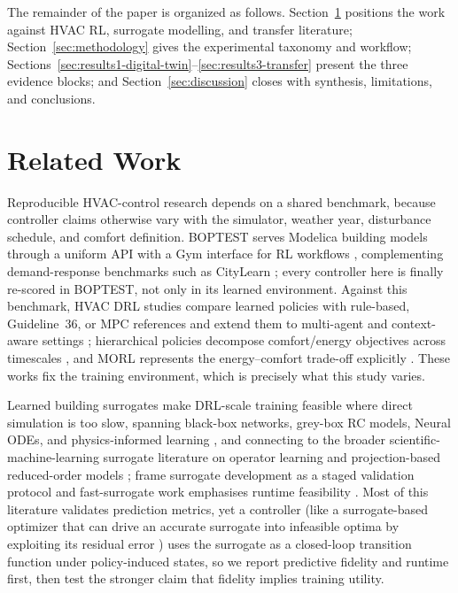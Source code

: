 \documentclass[a4paper,fleqn]{cas-sc}
\begin{document}
The remainder of the paper is organized as follows. Section~\ref{sec:related} positions the work against HVAC RL, surrogate modelling, and transfer literature; Section~\ref{sec:methodology} gives the experimental taxonomy and workflow; Sections~\ref{sec:results1-digital-twin}--\ref{sec:results3-transfer} present the three evidence blocks; and Section~\ref{sec:discussion} closes with synthesis, limitations, and conclusions.

\section{Related Work}\label{sec:related}
Reproducible HVAC-control research depends on a shared benchmark, because controller claims otherwise vary with the simulator, weather year, disturbance schedule, and comfort definition. BOPTEST serves Modelica building models through a uniform API \citep{Blum2021BOPTEST,Wetter2014Modelica} with a Gym interface for RL workflows \citep{Arroyo2021GymBOPTEST}, complementing demand-response benchmarks such as CityLearn \citep{VazquezCanteli2019CityLearn,VazquezCanteli2019Review}; every controller here is finally re-scored in BOPTEST, not only in its learned environment. Against this benchmark, HVAC DRL studies compare learned policies with rule-based, Guideline~36, or MPC references \citep{Savino2025ASHRAE,Wang2025SafeDRL,Nguyen2024Modelling,Sun2024DirectTSup} and extend them to multi-agent and context-aware settings \citep{Deng2025MultiAgent,Alotaibi2025ContextAware}; hierarchical policies decompose comfort/energy objectives across timescales \citep{Liao2025HDRL,Bacon2017Options,Nachum2018HIRO}, and MORL represents the energy--comfort trade-off explicitly \citep{Yang2019MORL,Roijers2013MOSurvey,Hayes2022MOSurvey,Byeon2025MaxMinMORL}. These works fix the training environment, which is precisely what this study varies.

Learned building surrogates make DRL-scale training feasible where direct simulation is too slow, spanning black-box networks, grey-box RC models, Neural ODEs, and physics-informed learning \citep{Bacher2011RCIdentification,Berthou2014RC,Bunning2020RC,Picard2017WhiteBox,Raissi2019PINN,Chen2018NeuralODE,Karpatne2017TheoryGuided,Willard2022PIML,Hedayat2025PINN}, and connecting to the broader scientific-machine-learning surrogate literature on operator learning and projection-based reduced-order models \citep{Lu2021DeepONet,Li2021FNO,Benner2015ROM}; \citet{HouEvins2024} frame surrogate development as a staged validation protocol and fast-surrogate work emphasises runtime feasibility \citep{Mshragi2026FastML}. Most of this literature validates prediction metrics, yet a controller (like a surrogate-based optimizer that can drive an accurate surrogate into infeasible optima by exploiting its residual error \citep{Jones1998EGO}) uses the surrogate as a closed-loop transition function under policy-induced states, so we report predictive fidelity and runtime first, then test the stronger claim that fidelity implies training utility.
\end{document}
